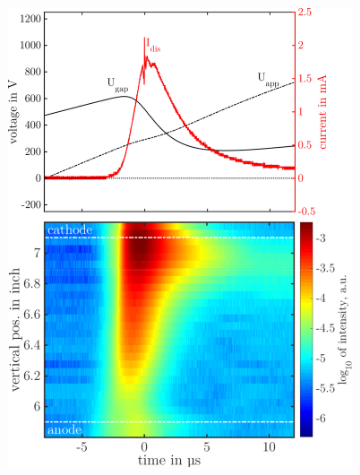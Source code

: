 \documentclass[a4paper,10pt,twoside]{article}
\begin{document}
			\begin{figure}
				\centering
				\begin{subfigure}[t]{0.49\textwidth}
					\includegraphics[width=\textwidth]{figures/706nm@sine/combination.pdf}
					\caption{}
					\label{img:combsine}
				\end{subfigure}
				\hfill
				\begin{subfigure}[t]{0.49\textwidth}

\end{subfigure}
\end{figure}
\end{document}
